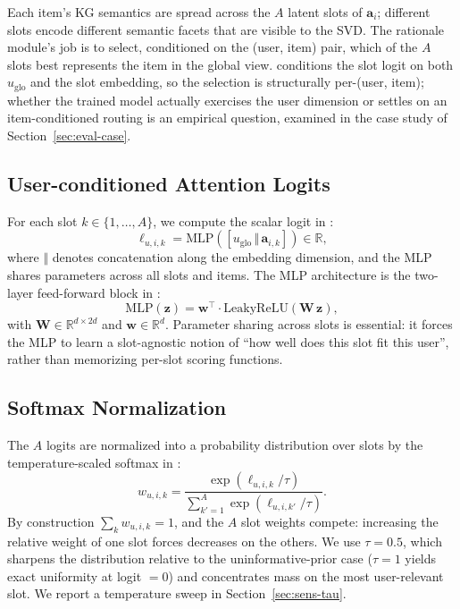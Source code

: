 Each item's KG semantics are spread across the $A$ latent slots of $\mathbf{a}_i$; different slots encode different semantic facets that are visible to the SVD. The rationale module's job is to select, conditioned on the (user, item) pair, which of the $A$ slots best represents the item in the global view.  conditions the slot logit on both $u_{\mathrm{glo}}$ and the slot embedding, so the selection is structurally per-(user, item); whether the trained model actually exercises the user dimension or settles on an item-conditioned routing is an empirical question, examined in the case study of Section~\ref{sec:eval-case}.

\subsection{User-conditioned Attention Logits}
\label{sec:softmax-logit}

For each slot $k \in \{1, \dots, A\}$, we compute the scalar logit in :
\begin{equation}
\label{eq:logit}
\ell_{u, i, k} = \mathrm{MLP}\!\left( [u_{\mathrm{glo}} \,\Vert\, \mathbf{a}_{i,k}] \right) \in \mathbb{R},
\end{equation}
where $\Vert$ denotes concatenation along the embedding dimension, and the MLP shares parameters across all slots and items. The MLP architecture is the two-layer feed-forward block in :
\begin{equation}
\label{eq:mlp}
\mathrm{MLP}(\mathbf{z}) = \mathbf{w}^{\top} \cdot \mathrm{LeakyReLU}\!\left(\mathbf{W}\, \mathbf{z}\right),
\end{equation}
with $\mathbf{W} \in \mathbb{R}^{d \times 2d}$ and $\mathbf{w} \in \mathbb{R}^{d}$. Parameter sharing across slots is essential: it forces the MLP to learn a slot-agnostic notion of ``how well does this slot fit this user'', rather than memorizing per-slot scoring functions.

\subsection{Softmax Normalization}
\label{sec:softmax-softmax}

The $A$ logits are normalized into a probability distribution over slots by the temperature-scaled softmax in :
\begin{equation}
\label{eq:softmax-w}
w_{u, i, k} = \frac{\exp(\ell_{u, i, k} / \tau)}{\sum_{k' = 1}^{A} \exp(\ell_{u, i, k'} / \tau)}.
\end{equation}
By construction $\sum_k w_{u, i, k} = 1$, and the $A$ slot weights compete: increasing the relative weight of one slot forces decreases on the others. We use $\tau = 0.5$, which sharpens the distribution relative to the uninformative-prior case ($\tau = 1$ yields exact uniformity at logit $= 0$) and concentrates mass on the most user-relevant slot. We report a temperature sweep in Section~\ref{sec:sens-tau}.

